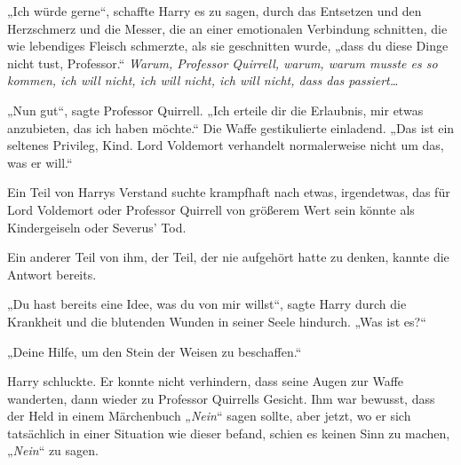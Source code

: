 „Ich würde gerne“, schaffte Harry es zu sagen, durch das Entsetzen und den Herzschmerz und die Messer, die an einer emotionalen Verbindung schnitten, die wie lebendiges Fleisch schmerzte, als sie geschnitten wurde, „dass du diese Dinge nicht tust, Professor.“
\emph{Warum, Professor Quirrell, warum, warum musste es so kommen, ich will nicht, ich will nicht, ich will nicht, dass das passiert…}

„Nun gut“, sagte Professor Quirrell. „Ich erteile dir die Erlaubnis, mir etwas anzubieten, das ich haben möchte.“
Die Waffe gestikulierte einladend.
„Das ist ein seltenes Privileg, Kind. Lord Voldemort verhandelt normalerweise nicht um das, was er will.“

Ein Teil von Harrys Verstand suchte krampfhaft nach etwas, irgendetwas, das für Lord Voldemort oder Professor Quirrell von größerem Wert sein könnte als Kindergeiseln oder Severus' Tod.

Ein anderer Teil von ihm, der Teil, der nie aufgehört hatte zu denken, kannte die Antwort bereits.

„Du hast bereits eine Idee, was du von mir willst“, sagte Harry durch die Krankheit und die blutenden Wunden in seiner Seele hindurch. „Was ist es?“

„Deine Hilfe, um den Stein der Weisen zu beschaffen.“

Harry schluckte. Er konnte nicht verhindern, dass seine Augen zur Waffe wanderten, dann wieder zu Professor Quirrells Gesicht.
Ihm war bewusst, dass der Held in einem Märchenbuch „\emph{Nein}“ sagen sollte, aber jetzt, wo er sich tatsächlich in einer Situation wie dieser befand, schien es keinen Sinn zu machen, „\emph{Nein}“ zu sagen.

